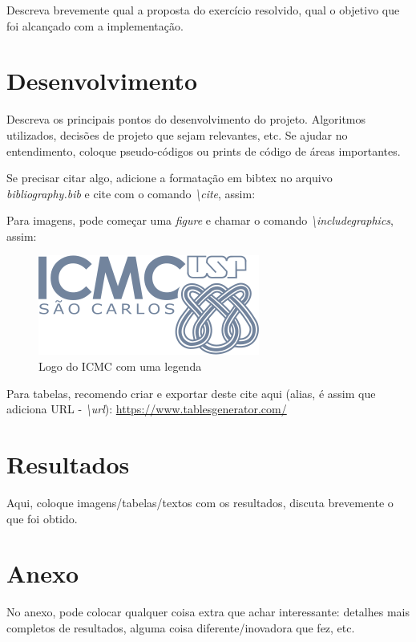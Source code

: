 \documentclass[a4paper, 12pt]{article}
\begin{document}
Descreva brevemente qual a proposta do exercício resolvido, qual o objetivo que foi alcançado com a implementação.
\newpage
\section{Desenvolvimento}

Descreva os principais pontos do desenvolvimento do projeto. Algoritmos utilizados, decisões de projeto que sejam relevantes, etc.
Se ajudar no entendimento, coloque pseudo-códigos ou prints de código de áreas importantes.

Se precisar citar algo, adicione a formatação em bibtex no arquivo \textit{bibliography.bib} e cite com o comando \textit{\textbackslash cite}, assim: \cite{even2011graph}

Para imagens, pode começar uma \textit{figure} e chamar o comando \textit{\textbackslash includegraphics}, assim:

\begin{figure}[h!]
\center 
\includegraphics[width=.8\textwidth]{logo.png}
\caption{Logo do ICMC com uma legenda}
\end{figure}

Para tabelas, recomendo criar e exportar deste cite aqui (alias, é assim que adiciona URL -  \textit{\textbackslash url}): \url{https://www.tablesgenerator.com/}

\newpage
\section{Resultados}
Aqui, coloque imagens/tabelas/textos com os resultados, discuta brevemente o que foi obtido.
\newpage


\newpage
{}
\section*{Anexo}
No anexo, pode colocar qualquer coisa extra que achar interessante: detalhes mais completos de resultados, alguma coisa diferente/inovadora que fez, etc.
\end{document}
